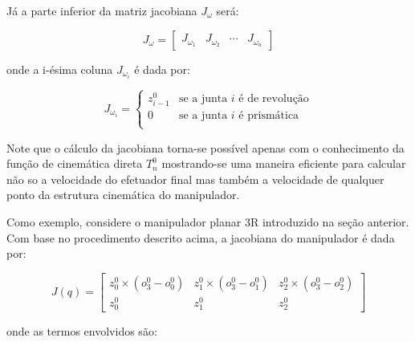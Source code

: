 Já a parte inferior da matriz jacobiana \(J_\omega\) será:

\begin{equation}
    J_\omega = \begin{bmatrix}
        J_{\omega_1} & J_{\omega_2} & \cdots & J_{\omega_n}
    \end{bmatrix}
\end{equation}

onde a i-ésima coluna \(J_{\omega_i}\) é dada por:

\begin{equation}
    J_{\omega_i} =
    \begin{cases}
        z_{i-1}^0 & \text{se a junta $i$ é de revolução} \\
        0         & \text{se a junta $i$ é prismática}   \\
    \end{cases}
\end{equation}

Note que o cálculo da jacobiana torna-se possível apenas com o conhecimento da
função de cinemática direta \(T_n^0\) mostrando-se uma maneira eficiente para calcular 
não so a velocidade do efetuador final mas também a velocidade de qualquer ponto da 
estrutura cinemática do manipulador.

Como exemplo, considere o manipulador planar 3R introduzido na seção anterior.
Com base no procedimento descrito acima, a jacobiana do manipulador é dada por:

\begin{equation}
    J(q) = \begin{bmatrix}
        z_0^0 \times (o_3^0 - o_0^0) & z_1^0 \times (o_3^0 - o_1^0) & z_2^0 \times (o_3^0 - o_2^0) \\
        z_0^0                        & z_1^0                        & z_2^0
    \end{bmatrix}
\end{equation}

onde as termos envolvidos são:

